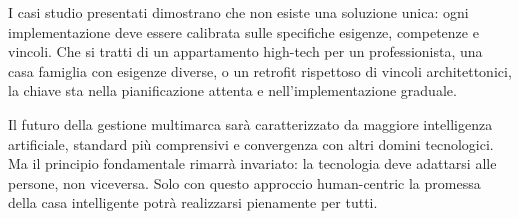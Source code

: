 I casi studio presentati dimostrano che non esiste una soluzione unica: ogni implementazione deve essere calibrata sulle specifiche esigenze, competenze e vincoli. Che si tratti di un appartamento high-tech per un professionista, una casa famiglia con esigenze diverse, o un retrofit rispettoso di vincoli architettonici, la chiave sta nella pianificazione attenta e nell'implementazione graduale.

Il futuro della gestione multimarca sarà caratterizzato da maggiore intelligenza artificiale, standard più comprensivi e convergenza con altri domini tecnologici. Ma il principio fondamentale rimarrà invariato: la tecnologia deve adattarsi alle persone, non viceversa. Solo con questo approccio human-centric la promessa della casa intelligente potrà realizzarsi pienamente per tutti.
